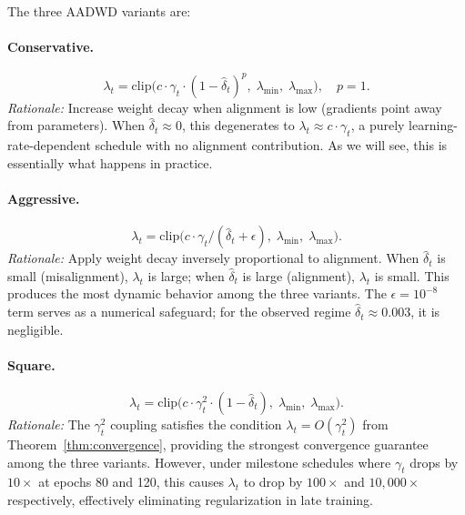 \documentclass{article}
\begin{document}
The three AADWD variants are:

\paragraph{Conservative.}
\begin{equation}
  \lambda_t = \mathrm{clip}\bigl(c \cdot \gamma_t \cdot (1 - \hat{\delta}_t)^p,\;
              \lambda_{\min},\;\lambda_{\max}\bigr), \quad p = 1.
  \label{eq:conservative}
\end{equation}
\emph{Rationale:}
Increase weight decay when alignment is low (gradients point away from parameters).
When $\hat{\delta}_t \approx 0$, this degenerates to $\lambda_t \approx c \cdot \gamma_t$,
a purely learning-rate-dependent schedule with no alignment contribution.
As we will see, this is essentially what happens in practice.

\paragraph{Aggressive.}
\begin{equation}
  \lambda_t = \mathrm{clip}\bigl(c \cdot \gamma_t / (\hat{\delta}_t + \epsilon),\;
              \lambda_{\min},\;\lambda_{\max}\bigr).
  \label{eq:aggressive}
\end{equation}
\emph{Rationale:}
Apply weight decay inversely proportional to alignment.
When $\hat{\delta}_t$ is small (misalignment), $\lambda_t$ is large; when
$\hat{\delta}_t$ is large (alignment), $\lambda_t$ is small.
This produces the most dynamic behavior among the three variants.
The $\epsilon = 10^{-8}$ term serves as a numerical safeguard; for the observed
regime $\hat{\delta}_t \approx 0.003$, it is negligible.

\paragraph{Square.}
\begin{equation}
  \lambda_t = \mathrm{clip}\bigl(c \cdot \gamma_t^2 \cdot (1 - \hat{\delta}_t),\;
              \lambda_{\min},\;\lambda_{\max}\bigr).
  \label{eq:square}
\end{equation}
\emph{Rationale:}
The $\gamma_t^2$ coupling satisfies the condition $\lambda_t = O(\gamma_t^2)$ from
Theorem~\ref{thm:convergence}, providing the strongest convergence guarantee among
the three variants.
However, under milestone schedules where $\gamma_t$ drops by $10\times$ at epochs 80
and 120, this causes $\lambda_t$ to drop by $100\times$ and $10{,}000\times$
respectively, effectively eliminating regularization in late training.
\end{document}
